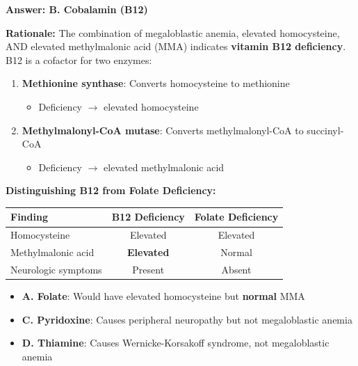 \begin{solution}
\textbf{Answer: B. Cobalamin (B12)}

\textbf{Rationale:} The combination of megaloblastic anemia, elevated homocysteine, AND elevated methylmalonic acid (MMA) indicates \textbf{vitamin B12 deficiency}. B12 is a cofactor for two enzymes:

\begin{enumerate}
    \item \textbf{Methionine synthase}: Converts homocysteine to methionine
    \begin{itemize}
        \item Deficiency $\rightarrow$ elevated homocysteine
    \end{itemize}
    \item \textbf{Methylmalonyl-CoA mutase}: Converts methylmalonyl-CoA to succinyl-CoA
    \begin{itemize}
        \item Deficiency $\rightarrow$ elevated methylmalonic acid
    \end{itemize}
\end{enumerate}

\textbf{Distinguishing B12 from Folate Deficiency:}
\begin{center}
\begin{tabular}{lcc}
\toprule
\textbf{Finding} & \textbf{B12 Deficiency} & \textbf{Folate Deficiency} \\
\midrule
Homocysteine & Elevated & Elevated \\
Methylmalonic acid & \textbf{Elevated} & Normal \\
Neurologic symptoms & Present & Absent \\
\bottomrule
\end{tabular}
\end{center}

\begin{itemize}
    \item \textbf{A. Folate}: Would have elevated homocysteine but \textbf{normal} MMA
    \item \textbf{C. Pyridoxine}: Causes peripheral neuropathy but not megaloblastic anemia
    \item \textbf{D. Thiamine}: Causes Wernicke-Korsakoff syndrome, not megaloblastic anemia
\end{itemize}
\end{solution}


